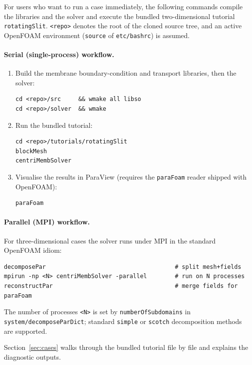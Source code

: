 \documentclass[11pt,a4paper]{article}
\begin{document}
For users who want to run a case immediately, the following commands
compile the libraries and the solver and execute the bundled
two-dimensional tutorial \texttt{rotatingSlit}.  \texttt{<repo>}
denotes the root of the cloned source tree, and an active OpenFOAM
environment (\texttt{source} of \texttt{etc/bashrc}) is assumed.

\paragraph{Serial (single-process) workflow.}
\begin{enumerate}
	\item Build the membrane boundary-condition and transport
	libraries, then the solver:
	\begin{verbatim}
cd <repo>/src     && wmake all libso
cd <repo>/solver  && wmake
	\end{verbatim}

	\item Run the bundled tutorial:
	\begin{verbatim}
cd <repo>/tutorials/rotatingSlit
blockMesh
centriMembSolver
	\end{verbatim}

	\item Visualise the results in ParaView (requires the
	\texttt{paraFoam} reader shipped with OpenFOAM):
	\begin{verbatim}
paraFoam
	\end{verbatim}
\end{enumerate}

\paragraph{Parallel (MPI) workflow.}
For three-dimensional cases the solver runs under MPI in the standard
OpenFOAM idiom:
\begin{verbatim}
decomposePar                                     # split mesh+fields
mpirun -np <N> centriMembSolver -parallel        # run on N processes
reconstructPar                                   # merge fields for paraFoam
\end{verbatim}
The number of processes \texttt{<N>} is set by
\texttt{numberOfSubdomains} in
\texttt{system/decomposeParDict}; standard \texttt{simple} or
\texttt{scotch} decomposition methods are supported.

Section~\ref{sec:cases} walks through the bundled tutorial file by
file and explains the diagnostic outputs.
\end{document}
